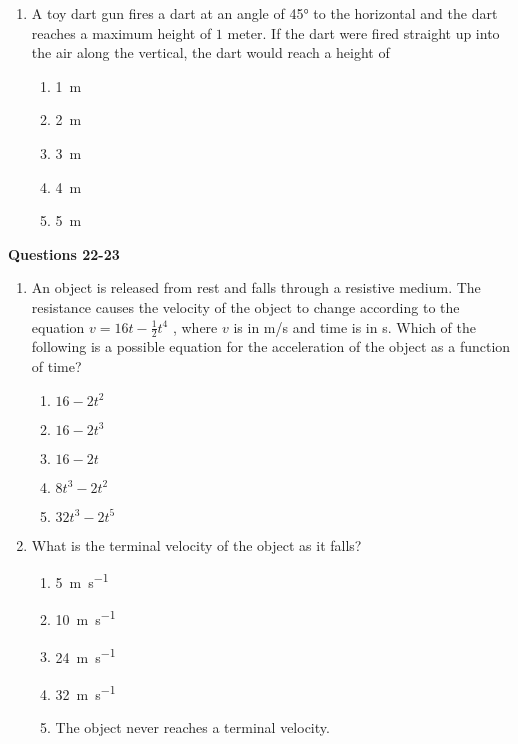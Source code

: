 \documentclass{../../oss-apphys}
\begin{document}
\begin{multicols}{2}
\begin{enumerate}[resume,leftmargin=18pt]
  \item A toy dart gun fires a dart at an angle of \ang{45} to the horizontal
    and the dart reaches a maximum height of $1$ meter. If the dart were fired
    straight up into the air along the vertical, the dart would reach a height
    of
    \begin{enumerate}[noitemsep,topsep=0pt,leftmargin=18pt,label=(\Alph*)]
    \item\SI{1}{\metre}
    \item\SI{2}{\metre}
    \item\SI{3}{\metre}
    \item\SI{4}{\metre}
    \item\SI{5}{\metre}
    \end{enumerate}
    
  \end{enumerate}
  
  \textbf{Questions 22-23}
  
  \begin{enumerate}[resume,leftmargin=18pt]
  \item An object is released from rest and falls through a resistive medium.
    The resistance causes the velocity of the object to change according to the
    equation $v=16t-\frac{1}{2}t^4$ , where $v$ is in \si{m/s} and time is in
    \si{\second}. Which of the following is a possible equation for the
    acceleration of the object as a function of time?
    \begin{enumerate}[noitemsep,topsep=0pt,leftmargin=18pt,label=(\Alph*)]
    \item $16-2t^2$
    \item $16-2t^3$
    \item $16-2t$
    \item $8t^3-2t^2$
    \item $32t^3-2t^5$
    \end{enumerate}
    
  \item What is the terminal velocity of the object as it falls?
    \begin{enumerate}[noitemsep,topsep=0pt,leftmargin=18pt,label=(\Alph*)]
    \item \SI{5 }{\metre\per\second}
    \item \SI{10}{\metre\per\second}
    \item \SI{24}{\metre\per\second}
    \item \SI{32}{\metre\per\second}
    \item The object never reaches a terminal velocity.
    \end{enumerate}
  

\end{enumerate}
\end{multicols}
\end{document}
